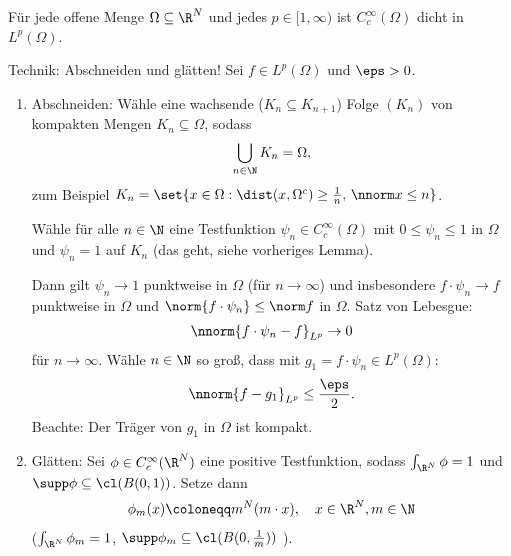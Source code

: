 \begin{theorem}
  Für jede offene Menge $\Omega \subseteq \R^{N}$ und jedes $p \in [1, \infty)$ ist $C_{c}^{\infty}(\Omega)$ dicht in $L^{p}(\Omega)$. 
\end{theorem}
\begin{beweis}Technik: Abschneiden und glätten! Sei $f \in L^{p}(\Omega)$ und $\eps > 0$. 
  \begin{enumerate}
  \item Abschneiden: Wähle eine wachsende ($K_{n} \subseteq K_{n+1}$) Folge $(K_{n})$ von kompakten Mengen $K_{n} \subseteq \Omega$, sodass
    \begin{align*}
      \bigcup _{n \in \N} K_{n} = \Omega, 
    \end{align*}
zum Beispiel $K_{n} = \set{x \in \Omega: \dist(x, \Omega^{c})\geq \frac 1 n, \, \nnorm x \leq n}$. 

Wähle für alle $n \in \N$ eine Testfunktion $\psi_{n} \in C_{c}^{\infty}(\Omega)$ mit $0 \leq \psi_{n} \leq 1$ in $\Omega$ und $\psi_{n} = 1$ auf $K_{n}$ (das geht, siehe vorheriges Lemma). 

Dann gilt $\psi_{n} \to 1$ punktweise in $\Omega$ (für $n \to \infty$) und insbesondere $f\cdot \psi_{n} \to f$ punktweise in $\Omega$ und $\norm{f \cdot \psi_{n}} \leq \norm f$ in $\Omega$. Satz von Lebesgue:
\begin{align*}
  \nnorm{f\cdot \psi_{n} - f}_{L^{p}} \to 0
\end{align*}
für $n \to \infty$. Wähle $n \in \N$ so groß, dass mit $g_{1} = f\cdot \psi_{n} \in L^{p}(\Omega)$:
\begin{align*}
  \nnorm{f - g_{1}}_{L^{p}} \leq \frac \eps 2. 
\end{align*}
Beachte: Der Träger von $g_{1}$ in $\Omega$ ist kompakt. 

\item Glätten: Sei $\phi \in C_{c}^{\infty}(\R^{N})$ eine positive Testfunktion, sodass $\int_{\R^{N}}\phi = 1$ und $\supp \phi \subseteq \cl(B(0, 1))$. Setze dann
  \begin{align*}
    \phi_{m}(x) \coloneqq m^{N}(m\cdot x), \quad x \in \R^{N}, m \in \N
  \end{align*}
($\int_{\R^{N}} \phi_{m} = 1$, $\supp \phi_{m}\subseteq \cl(B(0, \frac 1 m))$ ). 


\end{enumerate}
\end{beweis}
